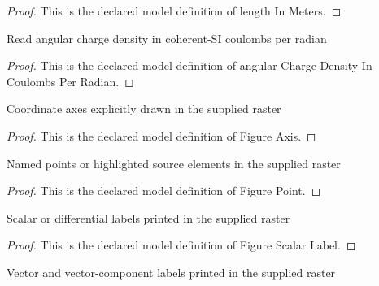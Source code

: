 \begin{proof}
  This is the declared model definition of length In Meters.
\end{proof}
\begin{definition}
  \label{def:physics:phyx-mini-0995:phyxminiproblems-problemphyxmini0995-angularchargedensityincoulombsperradian}
  Read angular charge density in coherent-SI coulombs per radian
\end{definition}
\begin{proof}
  This is the declared model definition of angular Charge Density In Coulombs Per Radian.
\end{proof}
\begin{definition}
  \label{def:physics:phyx-mini-0995:phyxminiproblems-problemphyxmini0995-figureaxis}
  Coordinate axes explicitly drawn in the supplied raster
\end{definition}
\begin{proof}
  This is the declared model definition of Figure Axis.
\end{proof}
\begin{definition}
  \label{def:physics:phyx-mini-0995:phyxminiproblems-problemphyxmini0995-figurepoint}
  Named points or highlighted source elements in the supplied raster
\end{definition}
\begin{proof}
  This is the declared model definition of Figure Point.
\end{proof}
\begin{definition}
  \label{def:physics:phyx-mini-0995:phyxminiproblems-problemphyxmini0995-figurescalarlabel}
  Scalar or differential labels printed in the supplied raster
\end{definition}
\begin{proof}
  This is the declared model definition of Figure Scalar Label.
\end{proof}
\begin{definition}
  \label{def:physics:phyx-mini-0995:phyxminiproblems-problemphyxmini0995-figurevectorlabel}
  Vector and vector-component labels printed in the supplied raster
\end{definition}
